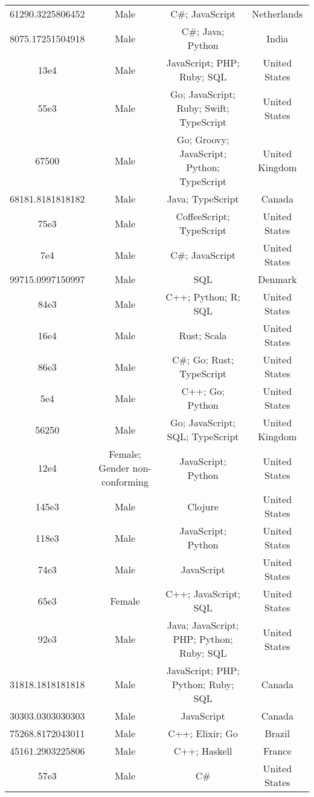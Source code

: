 \begin{center}
\begin{tabular}{ |c|c|c|c| }
61290.3225806452  &  Male  &  C\#; JavaScript  &  Netherlands  \\ 
8075.17251504918  &  Male  &  C\#; Java; Python  &  India  \\ 
13e4  &  Male  &  JavaScript; PHP; Ruby; SQL  &  United States  \\ 
55e3  &  Male  &  Go; JavaScript; Ruby; Swift; TypeScript  &  United States  \\ 
67500  &  Male  &  Go; Groovy; JavaScript; Python; TypeScript  &  United Kingdom  \\ 
68181.8181818182  &  Male  &  Java; TypeScript  &  Canada  \\ 
75e3  &  Male  &  CoffeeScript; TypeScript  &  United States  \\ 
7e4  &  Male  &  C\#; JavaScript  &  United States  \\ 
99715.0997150997  &  Male  &  SQL  &  Denmark  \\ 
84e3  &  Male  &  C++; Python; R; SQL  &  United States  \\ 
16e4  &  Male  &  Rust; Scala  &  United States  \\ 
86e3  &  Male  &  C\#; Go; Rust; TypeScript  &  United States  \\ 
5e4  &  Male  &  C++; Go; Python  &  United States  \\ 
56250  &  Male  &  Go; JavaScript; SQL; TypeScript  &  United Kingdom  \\ 
12e4  &  Female; Gender non-conforming  &  JavaScript; Python  &  United States  \\ 
145e3  &  Male  &  Clojure  &  United States  \\ 
118e3  &  Male  &  JavaScript; Python  &  United States  \\ 
74e3  &  Male  &  JavaScript  &  United States  \\ 
65e3  &  Female  &  C++; JavaScript; SQL  &  United States  \\ 
92e3  &  Male  &  Java; JavaScript; PHP; Python; Ruby; SQL  &  United States  \\ 
31818.1818181818  &  Male  &  JavaScript; PHP; Python; Ruby; SQL  &  Canada  \\ 
30303.0303030303  &  Male  &  JavaScript  &  Canada  \\ 
75268.8172043011  &  Male  &  C++; Elixir; Go  &  Brazil  \\ 
45161.2903225806  &  Male  &  C++; Haskell  &  France  \\ 
57e3  &  Male  &  C\#  &  United States  \\ 

\end{tabular}
\end{center}
